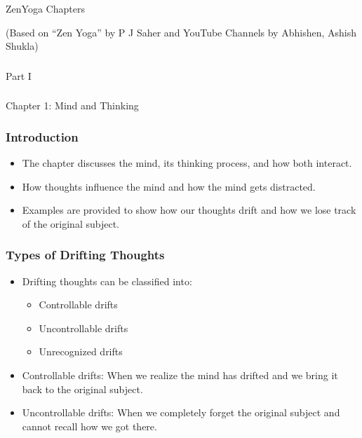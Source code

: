 \begin{frame}[fragile]\frametitle{}
\begin{center}
{\Large ZenYoga Chapters}


{\tiny (Based on ``Zen Yoga'' by P J Saher and YouTube Channels by Abhishen, Ashish Shukla)}
\end{center}
\end{frame}

\begin{frame}[fragile]\frametitle{}
\begin{center}
{\Large Part I}
\end{center}
\end{frame}

\begin{frame}[fragile]\frametitle{}
\begin{center}
{\Large Chapter 1: Mind and Thinking}
\end{center}
\end{frame}

\begin{frame}[fragile]\frametitle{Introduction}

\begin{itemize}
    \item The chapter discusses the mind, its thinking process, and how both interact.
    \item How thoughts influence the mind and how the mind gets distracted.
    \item Examples are provided to show how our thoughts drift and how we lose track of the original subject.
\end{itemize}

\end{frame}


\begin{frame}[fragile]\frametitle{Types of Drifting Thoughts}

\begin{itemize}
    \item Drifting thoughts can be classified into:
    \begin{itemize}
        \item Controllable drifts
        \item Uncontrollable drifts
        \item Unrecognized drifts
    \end{itemize}
    \item Controllable drifts: When we realize the mind has drifted and we bring it back to the original subject.
    \item Uncontrollable drifts: When we completely forget the original subject and cannot recall how we got there.
\end{itemize}

\end{frame}

